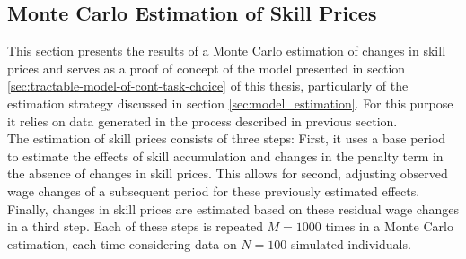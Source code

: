 \documentclass[../main.tex]{subfiles}
\begin{document}
\FloatBarrier
\subsection{Monte Carlo Estimation of Skill Prices} \label{sec:MC_estimation}
This section presents the results of a Monte Carlo estimation of changes in skill prices and serves as a proof of concept of the model presented in section \ref{sec:tractable-model-of-cont-task-choice} of this thesis, particularly of the estimation strategy discussed in section \ref{sec:model_estimation}. For this purpose it relies on data generated in the process described in previous section.
\\
The estimation of skill prices consists of three steps: First, it uses a base period to estimate the effects of skill accumulation and changes in the penalty term in the absence of changes in skill prices. This allows for second, adjusting observed wage changes of a subsequent period for these previously estimated effects. Finally, changes in skill prices are estimated based on these residual wage changes in a third step. Each of these steps is repeated $M=1000$ times in a Monte Carlo estimation, each time considering data on $N=100$ simulated individuals.
\\
\end{document}

